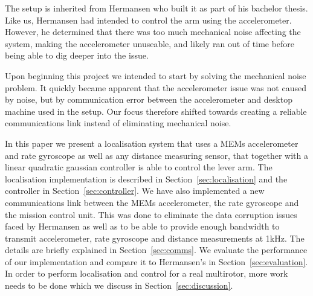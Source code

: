 The setup is inherited from Hermansen who built it as part of his bachelor thesis\cite{Hermansen2013a}.
Like us, Hermansen had intended to control the arm using the accelerometer. However, he determined that there was too much mechanical 
noise affecting the system, making the accelerometer unuseable, and likely ran out of time before being able to dig deeper into the 
issue.

Upon beginning this project we intended to start by solving the mechanical noise problem. It quickly became apparent that the 
accelerometer issue was not caused by noise, but by communication error between the accelerometer and desktop machine used in the setup.
Our focus therefore shifted towards creating a reliable communications link instead of eliminating mechanical noise.

In this paper we present a localisation system that uses a MEMs accelerometer and rate gyroscope as well as any distance measuring sensor,
that together with a linear quadratic gaussian controller is able to control the lever arm. The localisation implementation is described
in Section~\ref{sec:localisation} and the controller in Section~\ref{sec:controller}.
We have also implemented a new communications 
link between the MEMs accelerometer, the rate gyroscope and the mission control unit. This was done to eliminate the data corruption 
issues faced by Hermansen as well as to be able to provide enough bandwidth to transmit accelerometer, rate gyroscope and distance 
measurements at 1kHz. The details are briefly explained in Section~\ref{sec:comms}. 
We evaluate the performance of our implementation and compare it to Hermansen's in Section~\ref{sec:evaluation}. In order to 
perform localisation and control for a real multirotor, more work needs to be done which we discuss in Section~\ref{sec:discussion}.

